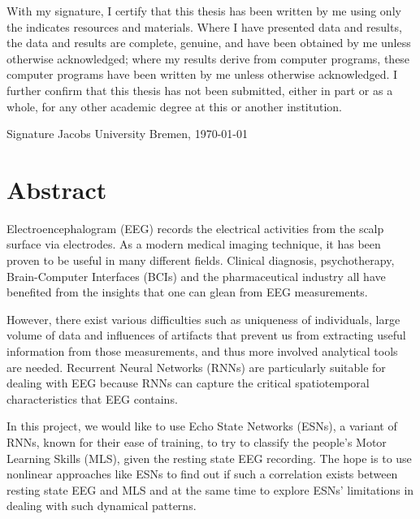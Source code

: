 \documentclass[a4paper,11pt,oneside]{article}
\begin{document}
With my signature, I certify that this thesis has been written by me
using only the indicates resources and materials. Where I have
presented data and results, the data and results are complete,
genuine, and have been obtained by me unless otherwise acknowledged;
where my results derive from computer programs, these computer
programs have been written by me unless otherwise acknowledged. I
further confirm that this thesis has not been submitted, either in
part or as a whole, for any other academic degree at this or another
institution.

\vspace{20mm}

Signature \hfill Jacobs University Bremen, \today

\newpage

\section*{Abstract}
Electroencephalogram (EEG) 
 records the electrical activities 
from the scalp surface via electrodes. As a modern medical imaging technique, 
it has been proven to be useful in many different fields. Clinical diagnosis, 
psychotherapy, Brain-Computer Interfaces (BCIs)  and the pharmaceutical industry all have 
benefited from the insights that one can glean from EEG measurements.

However, there exist various difficulties such as uniqueness of individuals, large volume of 
data and influences of artifacts that prevent us from extracting useful information from those 
measurements, and thus more involved analytical tools are needed. Recurrent Neural Networks (RNNs) 
are particularly suitable for dealing with EEG because RNNs can capture the critical spatiotemporal characteristics
that EEG contains.

In this project, we would like to use
 Echo State Networks (ESNs),  a variant of RNNs, known for their ease of training, to try to classify 
 the  people's Motor Learning Skills (MLS),  given the resting state EEG recording. The hope is to use nonlinear approaches 
like ESNs to find out if such a correlation exists between resting state EEG and MLS and at the same time to explore ESNs' limitations in dealing with such dynamical patterns.
\end{document}
